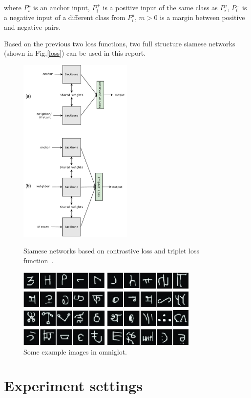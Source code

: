 \documentclass{article}
\begin{document}
where $P_i^a$ is an anchor input, $P_i^+$ is a positive input of the same class as $P_i^a$, $P_i^-$ is a negative input of a different class from $P_i^a$, $m > 0$ is a margin between positive and negative pairs.

Based on the previous two loss functions, two full structure siamese networks (shown in Fig,\ref{loss}) can be used in this report. 

\begin{figure}[!p]
  \centering
  \includegraphics[width=0.5\textwidth]{image/loss-function.jpg}
  \caption{Siamese networks based on contrastive loss and triplet loss function~\cite{ghojogh2020fisher}.}\label{loss}
  \bigskip
  
    \includegraphics[width=0.8\textwidth]{image/Example-images.jpg}
  \caption{Some example images in omniglot.}\label{omniglot}
\end{figure}



\section{Experiment settings}
\end{document}
